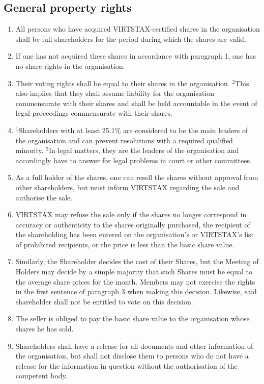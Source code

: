 \documentclass{article}
\begin{document}
\subsection{General property rights}
\begin{enumerate}[(1)]
	\item All persons who have acquired VIRTSTAX-certified shares in the organisation shall be full shareholders for the period during which the shares are valid.
	\item If one has not acquired these shares in accordance with paragraph 1, one has no share rights in the organisation.
	\item Their voting rights shall be equal to their shares in the organisation. $^{2}$This also implies that they shall assume liability for the organisation commensurate with their shares and shall be held accountable in the event of legal proceedings commensurate with their shares.
	\item $^{1}$Shareholders with at least 25.1\% are considered to be the main leaders of the organisation and can prevent resolutions with a required qualified minority. $^{2}$In legal matters, they are the leaders of the organisation and accordingly have to answer for legal problems in court or other committees.
	\item As a full holder of the shares, one can resell the shares without approval from other shareholders, but must inform VIRTSTAX regarding the sale and authorise the sale.
	\item VIRTSTAX may refuse the sale only if the shares no longer correspond in accuracy or authenticity to the shares originally purchased, the recipient of the shareholding has been entered on the organisation's or VIRTSTAX's list of prohibited recipients, or the price is less than the basic share value.
	\item Similarly, the Shareholder decides the cost of their Shares, but the Meeting of Holders may decide by a simple majority that such Shares must be equal to the average share prices for the month. Members may not exercise the rights in the first sentence of paragraph 3 when making this decision. Likewise, said shareholder shall not be entitled to vote on this decision.
	\item The seller is obliged to pay the basic share value to the organisation whose shares he has sold.
	\item Shareholders shall have a release for all documents and other information of the organisation, but shall not disclose them to persons who do not have a release for the information in question without the authorisation of the competent body.

\end{enumerate}
\end{document}
